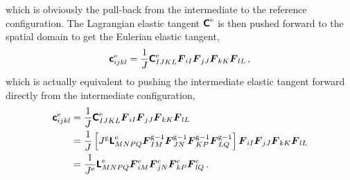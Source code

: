 \documentclass[10pt,letterpaper,oneside]{report}
\newcommand{\ten}[1]{\mbox{\boldmath $#1$}{}}
\newcommand{\tenf}[1]{\mbox{{\sffamily{\bfseries {#1}}}}}
\newcommand{\scas}[1]{\mbox{{\scriptsize{${\rm{#1}}$}}}{}}
\begin{document}
which is obviously the pull-back from the intermediate to the reference configuration.  The Lagrangian elastic tangent $\tenf{C}^{\scas{e}}$ is then pushed forward to the spatial domain to get the Eulerian elastic tangent, 
\begin{equation}
\tenf{c}^{\scas{e}}_{ijkl} = \frac{1}{J} \tenf{C}^{\scas{e}}_{IJKL} \ten{F}_{iI} \ten{F}_{jJ} \ten{F}_{kK} \ten{F}_{lL} \, ,
\end{equation}
which is actually equivalent to pushing the intermediate elastic tangent forward directly from the intermediate configuration,
\begin{align}
\tenf{c}^{\scas{e}}_{ijkl} ={}& \frac{1}{J} \tenf{C}^{\scas{e}}_{IJKL} \ten{F}_{iI} \ten{F}_{jJ} \ten{F}_{kK} \ten{F}_{lL} \\
={}& \frac{1}{J} \left[ J^{\scas{g}} \tenf{L}^{\scas{e}}_{MNPQ} \ten{F}^{\scas{g}-1}_{IM} \ten{F}^{\scas{g}-1}_{JN} \ten{F}^{\scas{g}-1}_{KP} \ten{F}^{\scas{g}-1}_{LQ} \right] \ten{F}_{iI} \ten{F}_{jJ} \ten{F}_{kK} \ten{F}_{lL} \notag \\
={}& \frac{1}{J^{\scas{e}}} \tenf{L}^{\scas{e}}_{MNPQ} \ten{F}^{e}_{iM} \ten{F}^{e}_{jN} \ten{F}^{e}_{kP}  \ten{F}^{e}_{lQ} \, .  
\end{align}
\end{document}
